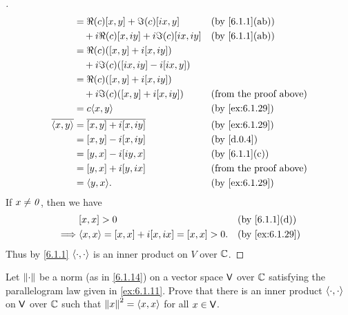 \begin{proof}[]
\begin{align*}
		                  & = \Re(c) [x, y] + \Im(c) [ix, y]                            &  & \by{6.1.1}[ab]                \\
		                  & \quad + i \Re(c) [x, iy] + i \Im(c) [ix, iy]                &  & \by{6.1.1}[ab]                \\
		                  & = \Re(c) ([x, y] + i[x, iy])                                                                   \\
		                  & \quad + i \Im(c) ([ix, iy] - i[ix, y])                                                         \\
		                  & = \Re(c) ([x, y] + i[x, iy])                                                                   \\
		                  & \quad + i \Im(c) ([x, y] + i[x, iy])                        &  & \text{(from the proof above)} \\
		                  & = c \inn{x, y}                                              &  & \by{ex:6.1.29}                \\
		\conj{\inn{x, y}} & = \conj{[x, y] + i[x, iy]}                                  &  & \by{ex:6.1.29}                \\
		                  & = [x, y] - i[x, iy]                                         &  & \by{d.0.4}                    \\
		                  & = [y, x] - i[iy, x]                                         &  & \by{6.1.1}[c]                 \\
		                  & = [y, x] + i[y, ix]                                         &  & \text{(from the proof above)} \\
		                  & = \inn{y, x}.                                               &  & \by{ex:6.1.29}
	\end{align*}
	If \(x \neq \mathit{0}\), then we have
	\begin{align*}
		         & [x, x] > 0                                   &  & \by{6.1.1}[d]  \\
		\implies & \inn{x, x} = [x, x] + i[x, ix] = [x, x] > 0. &  & \by{ex:6.1.29}
	\end{align*}
	Thus by \cref{6.1.1} \(\left\langle\cdot, \cdot\right\rangle\) is an inner product on \(V\) over \(\mathbb{C}\).
\end{proof}

\begin{ex}\label{ex:6.1.30}
	Let \(\left\lVert\cdot\right\rVert\) be a norm (as in \cref{6.1.14}) on a vector space \(\mathsf{V}\) over \(\mathbb{C}\) satisfying the parallelogram law given in \cref{ex:6.1.11}.
	Prove that there is an inner product \(\left\langle\cdot, \cdot\right\rangle\) on \(\mathsf{V}\) over \(\mathbb{C}\) such that \(\left\lVert x\right\rVert^2 = \left\langle x, x\right\rangle\) for all \(x \in \mathsf{V}\).
\end{ex}

